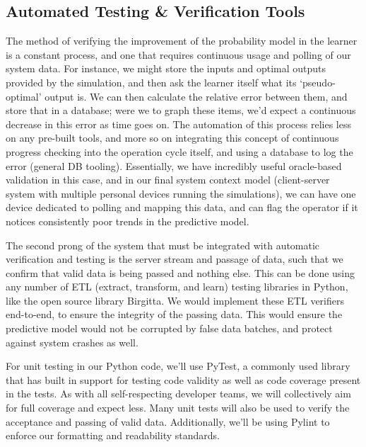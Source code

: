 \documentclass[12pt, titlepage]{article}
\begin{document}
\subsection{Automated Testing \& Verification Tools}
The method of verifying the improvement of the probability model in the learner is a constant process, and one that requires continuous usage and polling of our system data. For instance, we might store the inputs and optimal outputs provided by the simulation, and then ask the learner itself what its ‘pseudo-optimal’ output is. We can then calculate the relative error between them, and store that in a database; were we to graph these items, we’d expect a continuous decrease in this error as time goes on. The automation of this process relies less on any pre-built tools, and more so on integrating this concept of continuous progress checking into the operation cycle itself, and using a database to log the error (general DB tooling). Essentially, we have incredibly useful oracle-based validation in this case, and in our final system context model (client-server system with multiple personal devices running the simulations), we can have one device dedicated to polling and mapping this data, and can flag the operator if it notices consistently poor trends in the predictive model.

The second prong of the system that must be integrated with automatic verification and testing is the server stream and passage of data, such that we confirm that valid data is being passed and nothing else. This can be done using any number of ETL (extract, transform, and learn) testing libraries in Python, like the open source library Birgitta. We would implement these ETL verifiers end-to-end, to ensure the integrity of the passing data. This would ensure the predictive model would not be corrupted by false data batches, and protect against system crashes as well. 

For unit testing in our Python code, we’ll use PyTest, a commonly used library that has built in support for testing code validity as well as code coverage present in the tests. As with all self-respecting developer teams, we will collectively aim for full coverage and expect less. Many unit tests will also be used to verify the acceptance and passing of valid data. Additionally, we'll be using Pylint to enforce our formatting and readability standards.
\end{document}
